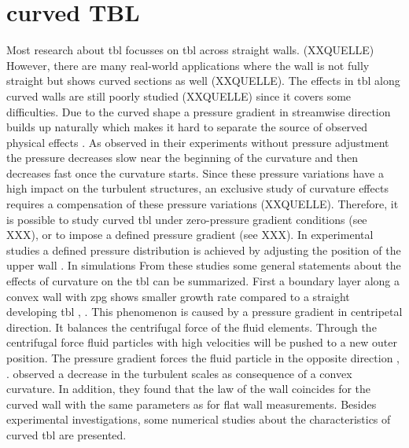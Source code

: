 \section{curved TBL}

Most research about \acrshort{tbl} focusses on \acrshort{tbl} across straight walls. (XXQUELLE) 
However, there are many real-world applications where the wall is not fully straight but shows curved sections as well (XXQUELLE). 
The effects in \acrshort{tbl} along curved walls are still poorly studied (XXQUELLE) since it covers some difficulties. 
Due to the curved shape a pressure gradient in streamwise direction builds up naturally which makes it hard to separate the source of observed physical effects \citep{so_experimental_nodate}. 
As \citet{so_experiment_1973} observed in their experiments without pressure adjustment the pressure decreases slow near the beginning of the curvature and then decreases fast once the curvature starts. 
Since these pressure variations have a high impact on the turbulent structures, an exclusive study of curvature effects requires a compensation of these pressure variations (XXQUELLE). 
Therefore, it is possible to study curved \acrshort{tbl} under zero-pressure gradient conditions (see XXX), or to impose a defined pressure gradient (see XXX). 
In experimental studies a defined pressure distribution is achieved by adjusting the position of the upper wall \citep{so_experimental_nodate, johnston_experimental_nodate, gillis_turbulent_1983,schwarz_convex_1996}. 
In simulations 
From these studies some general statements about the effects of curvature on the \acrshort{tbl} can be summarized.
First a boundary layer along a convex wall with \acrshort{zpg} shows smaller growth rate compared to a straight developing \acrfull{tbl} \citep{so_experimental_nodate}, \citep{meroney_turbulent_1975}. 
This phenomenon is caused by a pressure gradient in centripetal direction. 
It balances the centrifugal force of the fluid elements. Through the centrifugal force fluid particles with high velocities will be pushed to a new outer position. 
The pressure gradient forces the fluid particle in the opposite direction \citep{so_experimental_nodate}, \citep{meroney_turbulent_1975}.
\citet{gillis_turbulent_1983} observed a decrease in the turbulent scales as consequence of a convex curvature. 
In addition, they found that the law of the wall coincides for the curved wall with the same parameters as for flat wall measurements. 
Besides experimental investigations, some numerical studies about the characteristics of curved \acrshort{tbl} are presented.

